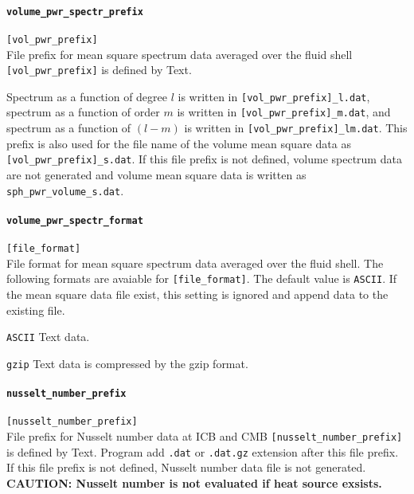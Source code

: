 \paragraph{\tt volume\_pwr\_spectr\_prefix}
\label{href_t:volume_pwr_spectr_prefix}
\verb|[vol_pwr_prefix]| \\
File prefix for mean square spectrum data averaged over the fluid shell \verb|[vol_pwr_prefix]| is defined by Text. 

Spectrum as a function of degree $l$ is written in \verb|[vol_pwr_prefix]_l.dat|, spectrum as a function of order $m$ is written in \verb|[vol_pwr_prefix]_m.dat|, and spectrum as a function of $(l-m)$ is written in \verb|[vol_pwr_prefix]_lm.dat|. This prefix is also used for the file name of the volume mean square data as \verb|[vol_pwr_prefix]_s.dat|.
If this file prefix is not defined, volume spectrum data are not generated and volume mean square data is written as \verb|sph_pwr_volume_s.dat|.

\paragraph{\tt volume\_pwr\_spectr\_format}
\label{href_t:volume_pwr_spectr_format}
\verb|[file_format]| \\
File format for mean square spectrum data averaged over the fluid shell. The following formats are avaiable for \verb|[file_format]|. The default value is \verb|ASCII|. If the mean square data file exist, this setting is ignored and append data to the existing file.
%
\begin{description}
\item{\tt ASCII}   Text data.
\item{\tt gzip}    Text data is compressed by the gzip format.
\end{description}
%

\paragraph{\tt nusselt\_number\_prefix}
\label{href_t:nusselt_number_prefix}
\verb|[nusselt_number_prefix]| \\
File prefix for Nusselt number data at ICB and CMB \verb|[nusselt_number_prefix]| is defined by Text. Program add {\tt .dat} or {\tt .dat.gz} extension after this file prefix. If this file prefix is not defined, Nusselt number data file is not generated. \\
{\bf CAUTION: Nusselt number is not evaluated if heat source exsists.}

